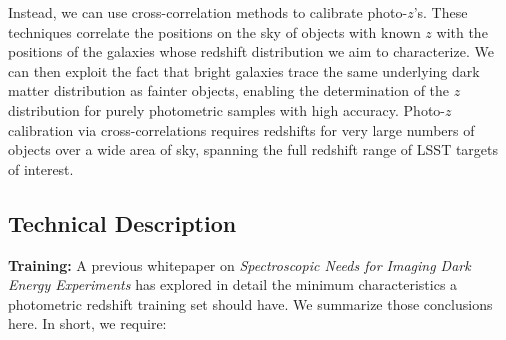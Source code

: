 Instead, we can use cross-correlation methods to calibrate photo-$z$'s.  These techniques correlate
the positions on the sky of objects with known $z$ with the positions of the galaxies whose redshift
distribution we aim to characterize.  We can then exploit the fact that bright galaxies trace the
same underlying dark matter distribution as fainter objects, enabling the determination of the $z$
distribution for purely photometric samples with high accuracy.  Photo-$z$ calibration via
cross-correlations requires redshifts for very large numbers of objects over a wide area of sky,
spanning the full redshift range of LSST targets of interest.




\subsection{Technical Description }



\label{sec:photoz_design}

{\bf Training:} A previous whitepaper on {\it Spectroscopic Needs for Imaging Dark Energy Experiments} \citep{Newman15} has explored in detail the minimum characteristics a photometric redshift training set should have.  We summarize those conclusions here.  In short, we require:

